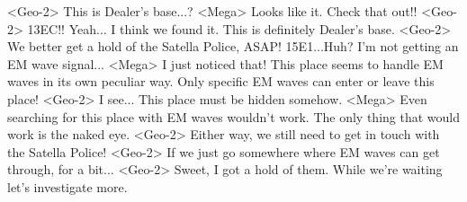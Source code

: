 <Geo-2> This is Dealer's base...? 
<Mega> Looks like it. 
Check that out!! 
<Geo-2> {13}{EC}!! 
Yeah... I think we found it. 
This is definitely Dealer's base. 
<Geo-2> We better get a hold of the Satella Police, ASAP! 
{15}{E1}...Huh? 
I'm not getting an EM wave signal... 
<Mega> I just noticed that! 
This place seems to handle EM waves in its own peculiar way. 
Only specific EM waves can enter or leave this place! 
<Geo-2> I see... This place must be hidden somehow. 
<Mega> Even searching for this place with EM waves wouldn't work. 
The only thing that would work is the naked eye. 
<Geo-2> Either way, we still need to get in touch with the Satella Police! 
<Geo-2> If we just go somewhere where EM waves can get through, for a bit... 
<Geo-2> Sweet, I got a hold of them. 
While we're waiting let's investigate more. 
